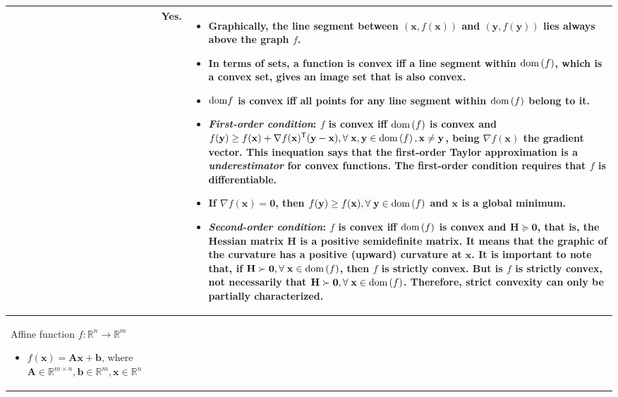 \documentclass{article}
\newcommand{\dom}[1]{\ensuremath{\textnormal{dom}\left(#1\right)}} %
\begin{document}
\begin{table}[ht!]
\begin{tabularx}{\textwidth}{|>{\setlength\hsize{1\hsize}\setlength\linewidth{\hsize}}X|>{\setlength\hsize{.9\hsize}\setlength\linewidth{\hsize}}X|>{\setlength\hsize{1.1\hsize}\setlength\linewidth{\hsize}}X|}
\begin{itemize}[leftmargin=*]
        \end{itemize} & Yes. & \vspace{-3.5ex}
        \begin{itemize}[leftmargin=*]
            \item Graphically, the line segment between \((\mathbf{x}, f(\mathbf{x}))\) and \((\mathbf{y}, f(\mathbf{y}))\) lies always above the graph \(f\).
            \item In terms of sets, a function is convex iff a line segment within \(\dom{f}\), which is a convex set, gives an image set that is also convex.
            \item \(\textnormal{dom} f\) is convex iff all points for any line segment within \(\dom{f}\) belong to it.
            \item \emph{First-order condition}: \(f\) is convex iff \(\dom{f}\) is convex and \(f(\mathbf{y}) \geq f(\mathbf{x}) + \nabla f (\mathbf{x})^\mathsf{T} (\mathbf{y} - \mathbf{x}),\forall\;\mathbf{x},\mathbf{y} \in \dom{f}, \mathbf{x}\neq\mathbf{y}\), being \(\nabla f (\mathbf{x})\) the gradient vector. This inequation says that the first-order Taylor approximation is a \emph{underestimator} for convex functions. The first-order condition requires that \(f\) is differentiable.
            \item If \(\nabla f(\mathbf{x}) = \mathbf{0}\), then \(f(\mathbf{y})\geq f(\mathbf{x}),\forall\;\mathbf{y}\in\dom{f}\) and \(\mathbf{x}\) is a global minimum.
            \item \emph{Second-order condition}: \(f\) is convex iff \(\dom{f}\) is convex and \(\mathbf{H}\succeq \mathbf{0}\), that is, the Hessian matrix \(\mathbf{H}\) is a positive semidefinite matrix. It means that the graphic of the curvature has a positive (upward) curvature at \(\mathbf{x}\). It is important to note that, if \(\mathbf{H}\succ\mathbf{0}, \forall\; \mathbf{x} \in \dom{f}\), then \(f\) is strictly convex. But is \(f\) is strictly convex, not necessarily that \(\mathbf{H}\succ\mathbf{0},\forall\; \mathbf{x} \in \dom{f}\). Therefore, strict convexity can only be partially characterized.
        \end{itemize}\\
        \hline
        Affine function \(f: \mathbb{R}^n \rightarrow \mathbb{R}^m\)
        \begin{itemize}[leftmargin=*]
            \item $f(\mathbf{x}) = \mathbf{Ax} + \mathbf{b}$, where \(\mathbf{A} \in \mathbb{R}^{m\times n}, \mathbf{b} \in \mathbb{R}^{m}, \mathbf{x} \in \mathbb{R}^{n}\)

\end{itemize}
\end{tabularx}
\end{table}
\end{document}
